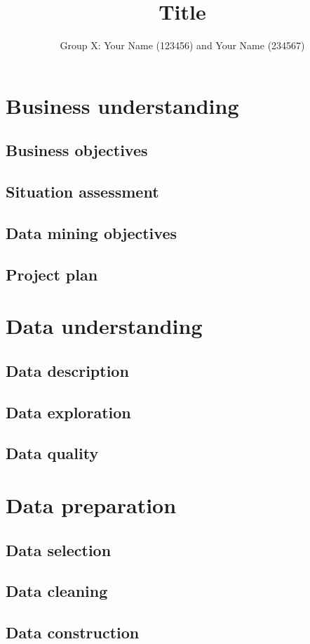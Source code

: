 \documentclass[12pt]{IEEEtran}
\title{Title}
\author{Group X: Your Name (123456) and Your Name (234567)}
\begin{document}
\maketitle

\section{Business understanding}
\subsection{Business objectives}
\subsection{Situation assessment}
\subsection{Data mining objectives}
\subsection{Project plan}

\section{Data understanding}
\subsection{Data description}
\subsection{Data exploration}
\subsection{Data quality}

\section{Data preparation}
\subsection{Data selection}
\subsection{Data cleaning}
\subsection{Data construction}
\end{document}
